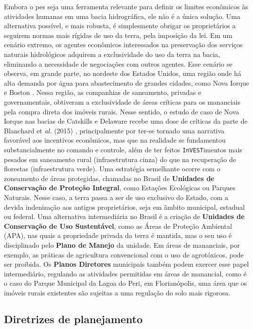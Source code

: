 \documentclass[./main.tex]{subfiles}
\begin{document}
\par Embora o \acrshort{pes} seja uma ferramenta relevante para definir os limites econômicos às atividades humanas em uma bacia hidrográfica, ele não é a única solução. Uma alternativa possível, e mais robusta, é simplesmente obrigar os proprietários a seguirem normas mais rígidas de uso da terra, pela imposição da lei. Em um cenário extremo, os agentes econômicos interessados na preservação dos serviços naturais hidrológicos adquirem a exclusividade do uso da terra na bacia, eliminando a necessidade de negociações com outros agentes. Esse cenário se observa, em grande parte, no nordeste dos Estados Unidos, uma região onde há alta demanda por água para abastecimento de grandes cidades, como Nova Iorque e Boston \cite{alcott2013}. Nessa região, as companhias de saneamento, privadas e governamentais, obtiveram a exclusividade de áreas críticas para os mananciais pela compra direta dos imóveis rurais. Nesse sentido, o estudo de caso de Nova Iorque nas bacias de Catskills e Delaware recebe uma dose de críticas da parte de Blanchard et \textit{al.} (2015) \cite{Blanchard2015a}, principalmente por ter-se tornado uma narrativa favorável aos incentivos econômicos, mas que na realidade se fundamentou substancialmente no comando e controle, além de ter feitos \texttt{InVEST}imentos mais pesados em saneamento rural (infraestrutura cinza) do que na recuperação de florestas (infraestrutura verde). Uma estratégia semelhante ocorre com o zoneamento de áreas protegidas, chamadas no Brasil de \textbf{Unidades de Conservação de Proteção Integral}, como Estações Ecológicas ou Parques Naturais. Nesse caso, a terra passa a ser de uso exclusivo do Estado, com a devida indenização aos antigos proprietários, seja em âmbito municipal, estadual ou federal. Uma alternativa intermediária no Brasil é a criação de \textbf{Unidades de Conservação de Uso Sustentável}, como as Áreas de Proteção Ambiental (APA), nas quais a propriedade privada da terra é mantida, mas o seu uso é disciplinado pelo \textbf{Plano de Manejo} da unidade. Em áreas de mananciais, por exemplo, as práticas de agricultura convencional com o uso de agrotóxicos, pode ser proibida. Os \textbf{Planos Diretores} municipais também podem exercer esse papel intermediário, regulando as atividades permitidas em áreas de manancial, como é o caso do Parque Municipal da Lagoa do Peri, em Florianópolis, uma área que os imóveis rurais existentes são sujeitas a uma regulação do solo mais rigorosa.

\subsection{Diretrizes de planejamento}
\end{document}
